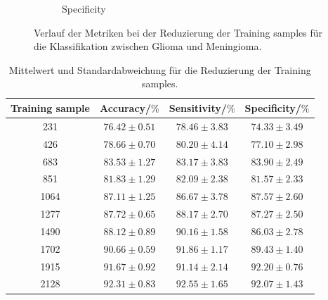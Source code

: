 \begin{figure}[H]
\begin{subfigure}[b]{0.48\textwidth}
    \caption{Specificity}
    \label{fig:gli-men-spec}
  \end{subfigure}
  \caption{Verlauf der Metriken bei der Reduzierung der Training samples für die Klassifikation zwischen Glioma und Meningioma.}
  \label{fig:gli-men-reduktion}
\end{figure}
\begin{table}[H]
    \centering
    {\small
        \begin{tabular}{cccc}
            \toprule
            Training sample & Accuracy/$\%$ & Sensitivity/$\%$ & Specificity/$\%$\\
            \midrule
            231  & $76.42 \pm 0.51 $ & $78.46 \pm 3.83$ & $74.33 \pm 3.49$\\
            426  & $78.66 \pm 0.70 $ & $80.20 \pm 4.14$ & $77.10 \pm 2.98$\\
            683  & $83.53 \pm 1.27 $ & $83.17 \pm 3.83$ & $83.90 \pm 2.49$\\
            851  & $81.83 \pm 1.29 $ & $82.09 \pm 2.38$ & $81.57 \pm 2.33$\\
            1064 & $87.11 \pm 1.25 $ & $86.67 \pm 3.78$ & $87.57 \pm 2.60$\\
            1277 & $87.72 \pm 0.65 $ & $88.17 \pm 2.70$ & $87.27 \pm 2.50$\\
            1490 & $88.12 \pm 0.89 $ & $90.16 \pm 1.58$ & $86.03 \pm 2.78$\\
            1702 & $90.66 \pm 0.59 $ & $91.86 \pm 1.17$ & $89.43 \pm 1.40$\\
            1915 & $91.67 \pm 0.92 $ & $91.14 \pm 2.14$ & $92.20 \pm 0.76$\\
            2128 & $92.31 \pm 0.83 $ & $92.55 \pm 1.65$ & $92.07 \pm 1.43$\\            
            \bottomrule
        \end{tabular}}
  \caption{Mittelwert und Standardabweichung für die Reduzierung der Training samples.}
  \label{tab:Red-gli-men}
\end{table}
\vspace{-3.5em}
